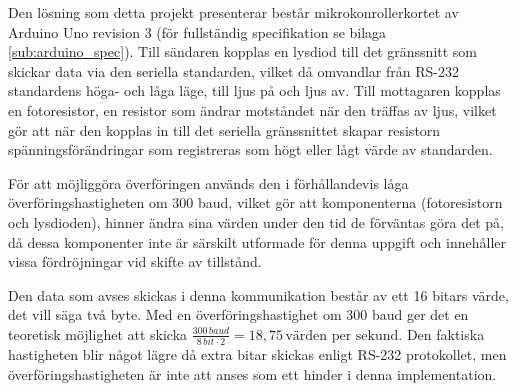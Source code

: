         Den lösning som detta projekt presenterar består mikrokonrollerkortet av Arduino Uno revision 3 (för fullständig specifikation se bilaga \ref{sub:arduino_spec}\cite{ardu}). Till sändaren kopplas en lysdiod till det gränssnitt som skickar data via den seriella standarden, vilket då omvandlar från RS-232 standardens höga- och låga läge, till ljus på och ljus av. Till mottagaren kopplas en fotoresistor, en resistor som ändrar motståndet när den träffas av ljus, vilket gör att när den kopplas in till det seriella gränssnittet skapar resistorn spänningsförändringar som registreras som högt eller lågt värde av standarden. \bigskip

        För att möjliggöra överföringen används den i förhållandevis låga överföringshastigheten om 300 baud, vilket gör att komponenterna (fotoresistorn och lysdioden), hinner ändra sina värden under den tid de förväntas göra det på, då dessa komponenter inte är särskilt utformade för denna uppgift och innehåller vissa fördröjningar vid skifte av tillstånd. \bigskip

        Den data som avses skickas i denna kommunikation består av ett 16 bitars värde, det vill säga två byte. Med en överföringshastighet om 300 baud ger det en teoretisk möjlighet att skicka $\frac{300 \,\textit{baud}}{8 \, bit \cdot 2} = 18,75 \, \text{värden per sekund}$. Den faktiska hastigheten blir något lägre då extra bitar skickas enligt RS-232 protokollet, men överföringshastigheten är inte att anses som ett hinder i denna implementation.

